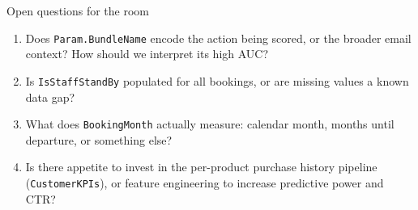 \documentclass[aspectratio=169,11pt]{beamer}
\begin{document}
\begin{frame}{Open questions for the room}
  \begin{enumerate}
    \setlength\itemsep{0.7em}
    \item Does \texttt{Param.BundleName} encode the action being scored, or the broader email context? How should we interpret its high AUC?
    \item Is \texttt{IsStaffStandBy} populated for all bookings, or are missing values a known data gap?
    \item What does \texttt{BookingMonth} actually measure: calendar month, months until departure, or something else?
    \item Is there appetite to invest in the per-product purchase history pipeline (\texttt{CustomerKPIs}), or feature engineering to increase predictive power and CTR?
  \end{enumerate}
\end{frame}

\begin{frame}
  \vfill
  \begin{center}
    \\[1em]
    \color{white}{\rule{4em}{2pt}}\\[1em]
  \end{center}
  \vfill
\end{frame}
\end{document}
